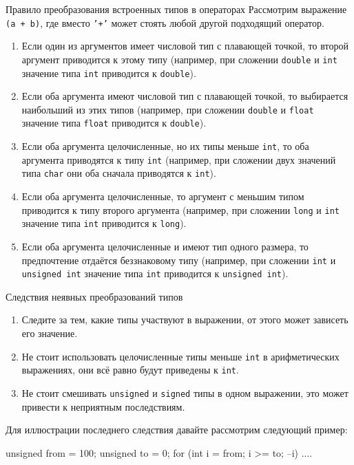 \documentclass[9pt]{beamer}
\begin{document}
\begin{frame}{Правило преобразования встроенных типов в операторах}
    Рассмотрим выражение \texttt{(a + b)}, где вместо \texttt{'+'} может стоять любой другой подходящий оператор.
    \begin{enumerate}
        \item Если один из аргументов имеет числовой тип с плавающей точкой, то второй аргумент приводится к этому типу (например, при сложении \texttt{double} и \texttt{int} значение типа \texttt{int} приводится к \texttt{double}).
        \item Если оба аргумента имеют числовой тип с плавающей точкой, то выбирается наибольший из этих типов (например, при сложении \texttt{double} и \texttt{float} значение типа \texttt{float} приводится к \texttt{double}).
        \item Если оба аргумента целочисленные, но их типы меньше \texttt{int}, то оба аргумента приводятся к типу \texttt{int} (например, при сложении двух значений типа \texttt{char} они оба сначала приводятся к \texttt{int}).
        \item Если оба аргумента целочисленные, то аргумент с меньшим типом приводится к типу второго аргумента (например, при сложении \texttt{long} и \texttt{int} значение типа \texttt{int} приводится к \texttt{long}).
        \item Если оба аргумента целочисленные и имеют тип одного размера, то предпочтение отдаётся беззнаковому типу (например, при сложении \texttt{int} и \texttt{unsigned int} значение типа \texttt{int} приводится к \texttt{unsigned int}).
    \end{enumerate}
\end{frame}

\begin{frame}[fragile]{Следствия неявных преобразований типов}
    \begin{enumerate}
        \item Следите за тем, какие типы участвуют в выражении, от этого может зависеть его значение.
        \item Не стоит использовать целочисленные типы меньше \texttt{int} в арифметических выражениях, они всё равно будут приведены к \texttt{int}.
        \item \alert{Не стоит смешивать \texttt{unsigned} и \texttt{signed}} типы в одном выражении, это может привести к неприятным последствиям.
    \end{enumerate}

    Для иллюстрации последнего следствия давайте рассмотрим следующий пример:
    \begin{cppcode}
        unsigned from = 100;
        unsigned to = 0;
        for (int i = from; i >= to; --i) {  ....  }
    \end{cppcode}    
\end{frame}
\end{document}
